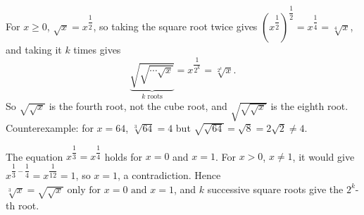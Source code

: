 For $x\ge0$, $\sqrt{x}=x^{\dfrac{1}{2}}$, so taking the square root twice gives $\left(x^{\dfrac{1}{2}}\right)^{\dfrac{1}{2}}=x^{\dfrac{1}{4}}=\sqrt[4]{x}$, and taking it $k$ times gives
\[
\underbrace{\sqrt{\sqrt{\cdots\sqrt{x}}}}_{k\text{ roots}}=x^{\dfrac{1}{2^k}}=\sqrt[2^k]{x}.
\]
So $\sqrt{\sqrt{x}}$ is the fourth root, not the cube root, and $\sqrt{\sqrt{\sqrt{x}}}$ is the eighth root. Counterexample: for $x=64$, $\sqrt[3]{64}=4$ but $\sqrt{\sqrt{64}}=\sqrt8=2\sqrt2\ne4$.

The equation $x^{\dfrac{1}{3}}=x^{\dfrac{1}{4}}$ holds for $x=0$ and $x=1$. For $x>0$, $x\ne1$, it would give $x^{\dfrac{1}{3}-\dfrac{1}{4}}=x^{\dfrac{1}{12}}=1$, so $x=1$, a contradiction. Hence $\boxed{\sqrt[3]{x}=\sqrt{\sqrt x}\text{ only for }x=0\text{ and }x=1}$, and $k$ successive square roots give the $2^k$-th root.
